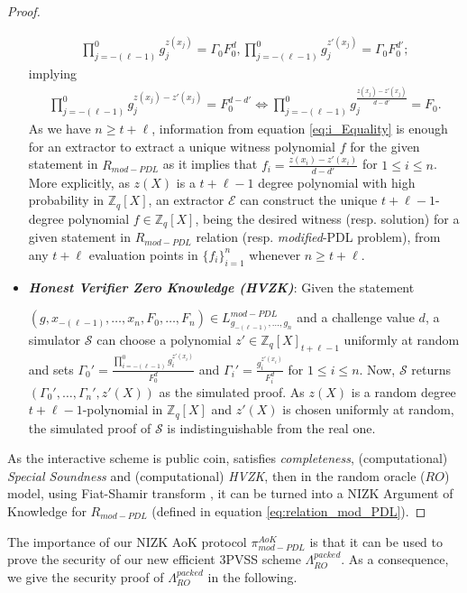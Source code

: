 \begin{proof}
\begin{itemize}
\begin{align*}
        \prod_{j=-(\ell-1)}^{0}g_j^{z(x_j)}=\Gamma_0 F_0^d,\prod_{j=-(\ell-1)}^{0}g_j^{z'(x_j)}=\Gamma_0 F_0^{d'};
      \end{align*}
      implying
      \begin{align}\label{eq:0_Equality}
        \prod_{j=-(\ell-1)}^{0}g_j^{z(x_j)-z'(x_j)}=F_0^{d-d'} \iff \prod_{j=-(\ell-1)}^{0}g_j^{\frac{z(x_j)-z'(x_j)}{d-d'}}=F_0.
      \end{align}
      As we have $n\geq t+\ell$, information from equation \ref{eq:i_Equality} is enough for 
      an extractor to extract a unique witness polynomial $f$ for the given statement in $R_{mod-PDL}$ 
      as it implies that $f_i=\frac{z(x_i)-z'(x_i)}{d-d'}$ for 
      $1\leq i\leq n$. More explicitly, as $z(X)$ is a $t+\ell-1$ degree 
      polynomial with high probability in $\mathbb{Z}_q[X]$, an extractor $\mathcal{E}$ can construct the unique $t+\ell-1$-degree 
      polynomial $f\in\mathbb{Z}_q[X]$, being the desired witness (resp. solution) for a given statement in $R_{mod-PDL}$ relation (resp. \textit{modified}-PDL problem), 
      from any $t+\ell$ evaluation points in $\{f_i\}_{i=1}^n$ whenever $n\geq t+\ell$.
    \item \textit{\textbf{Honest Verifier Zero Knowledge (HVZK)}}: Given the statement\par $(g,x_{-(\ell-1)},\dots,x_n,F_0,\dots,F_n)\in L_{g_{-(\ell-1)},\dots,g_n}^{mod-PDL}$  
      and a challenge value $d$, a simulator $\mathcal{S}$ can choose a polynomial $z'\in\mathbb{Z}_q[X]_{t+\ell-1}$ uniformly 
      at random and sets $\Gamma_0'=\frac{\prod_{i=-(\ell-1)}^{0}g_i^{z'(x_i)}}{F_0^d}$ and 
      $\Gamma_i'=\frac{g_i^{z'(x_i)}}{F_i^d}$ for $1\leq i\leq n$. 
      Now, $\mathcal{S}$ returns $(\Gamma_0',\dots,\Gamma_n',z'(X))$ as the simulated proof. As $z(X)$ is a random 
      degree $t+\ell-1$-polynomial in $\mathbb{Z}_q[X]$ and $z'(X)$ is chosen uniformly at random, 
      the simulated proof of $\mathcal{S}$ is indistinguishable from the real one.
  \end{itemize}
  As the interactive scheme is public coin, satisfies \textit{completeness}, (computational) \textit{Special Soundness} 
  and (computational) \textit{HVZK}, then in the random oracle ($RO$) model, using Fiat-Shamir transform \cite{10.1007/3-540-47721-7_12}, 
  it can be turned into a NIZK Argument of Knowledge for $R_{mod-PDL}$ (defined in equation \ref{eq:relation_mod_PDL}).
\end{proof}

The importance of our NIZK AoK protocol $\pi_{mod-PDL}^{AoK}$ is that it can be used to 
prove the security of our new efficient 3PVSS scheme $\Lambda_{RO}^{packed}$. As a consequence, we 
give the security proof of $\Lambda_{RO}^{packed}$ in the following.

